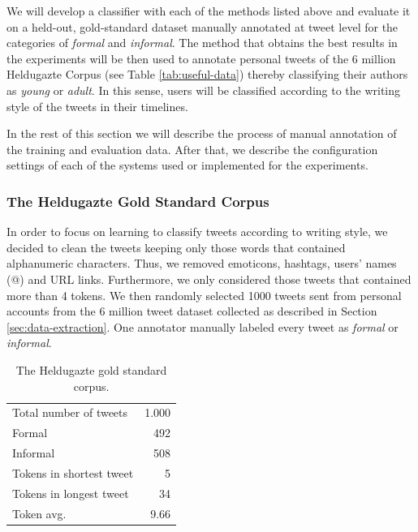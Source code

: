 \documentclass[information,article,submit,moreauthors,pdftex,10pt,a4paper]{Definitions/mdpi}
\begin{document}
We will develop a classifier with each of the methods listed above and evaluate it on a held-out, gold-standard dataset manually annotated at tweet level for the categories of \emph{formal} and \emph{informal}. The method that obtains the best results in the experiments will be then used to annotate personal tweets of the 6 million Heldugazte Corpus (see Table \ref{tab:useful-data}) thereby classifying their authors as \emph{young} or \emph{adult}. In this sense, users will be classified according to the writing style of the tweets in their timelines.

In the rest of this section we will describe the process of manual annotation of the training and evaluation data. After that, we describe the configuration settings of each of the systems used or implemented for the experiments.

\subsubsection{The Heldugazte Gold Standard Corpus}\label{sec:gold-standard-data}

In order to focus on learning to classify tweets according to writing style, we decided to clean the tweets keeping only those words that contained alphanumeric characters. Thus, we removed emoticons, hashtags, users' names (@) and URL links. Furthermore, we only considered those tweets that contained more than 4 tokens. We then randomly selected 1000 tweets sent from personal accounts from the 6 million tweet dataset collected as described in Section \ref{sec:data-extraction}. One annotator manually labeled every tweet as \emph{formal} or \emph{informal}.

\begin{table}[H]
  \centering
  \begin{tabular}{lr} \hline \hline
    Total number of tweets & 1.000 \\
    Formal & 492 \\
    Informal & 508 \\
    Tokens in shortest tweet & 5 \\
    Tokens in longest tweet & 34 \\
    Token avg. & 9.66 \\ \hline
  \end{tabular}
  \caption{The Heldugazte gold standard corpus.}
  \label{tab:gold-corpus}
\end{table}
\end{document}
